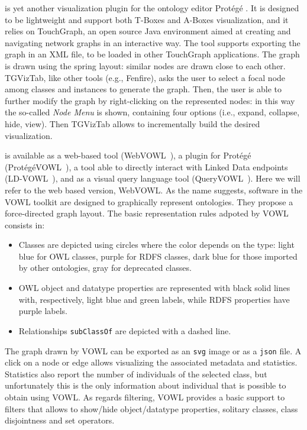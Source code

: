 \begin{description}[wide, labelindent=0pt]
\item[TGVizTab] is yet another visualization plugin for the ontology editor Prot\'eg\'e \cite{alani2003tgviztab}. It is designed to be lightweight and support both T-Boxes and A-Boxes visualization, and it relies on TouchGraph, an open source Java environment aimed at creating and navigating network graphs in an interactive way. The tool supports exporting the graph in an XML file, to be loaded in other TouchGraph applications. The graph is drawn using the spring layout: similar nodes are drawn close to each other. TGVizTab, like other tools (e.g., Fenfire), asks the user to select a focal node among classes and instances to generate the graph. Then, the user is able to further modify the graph by right-clicking on the represented nodes: in this way the so-called \textit{Node Menu} is shown, containing four options (i.e., expand, collapse, hide, view). Then TGVizTab allows to incrementally build the desired visualization.

\item[VOWL (Visual OWL)] is available as a web-based tool (WebVOWL~\cite{WebVOWL, lohmann2016visualizing}), a plugin for Prot\'eg\'e (Prot\'eg\'eVOWL~\cite{ProtegeVOWL}), a tool able to directly interact with Linked Data endpoints (LD-VOWL~\cite{weise2016ld}), and as a visual query language tool (QueryVOWL~\cite{haag2015queryvowl}). Here we will refer to the web based version, WebVOWL. As the name suggests, software in the VOWL toolkit are designed to graphically represent ontologies. They propose a force-directed graph layout. The basic representation rules adpoted by VOWL consists in:

\begin{itemize}
    \item Classes are depicted using circles where the color depends on the type: light blue for OWL classes, purple for RDFS classes, dark blue for those imported by other ontologies, gray for deprecated classes. 
    \item OWL object and datatype properties are represented with black solid lines with, respectively, light blue and green labels, while RDFS properties have purple labels.
    \item Relationships \texttt{subClassOf} are depicted with a dashed line.
\end{itemize}

The graph drawn by VOWL can be exported as an \texttt{svg} image or as a \texttt{json} file. A click on a node or edge allows visualizing the associated metadata and statistics. Statistics also report the number of individuals of the selected class, but unfortunately this is the only information about individual that is possible to obtain using VOWL. As regards filtering, VOWL provides a basic support to filters that allows to show/hide object/datatype properties, solitary classes, class disjointness and set operators.


\end{description}
